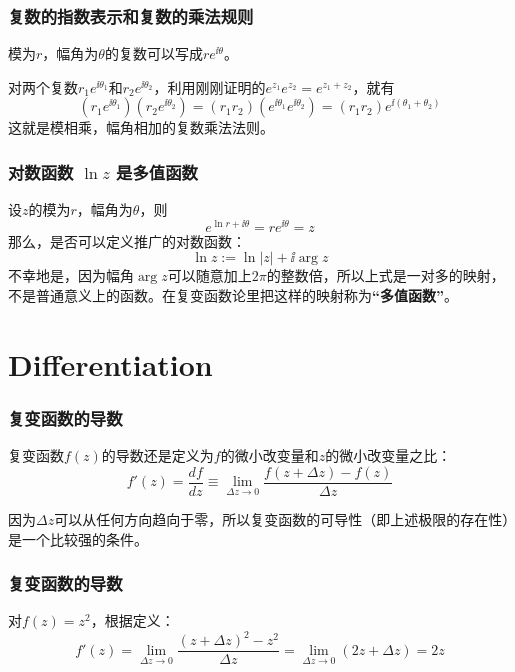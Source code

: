 \documentclass[CJK]{beamer}
\begin{document}
\begin{frame}
  \frametitle{复数的指数表示和复数的乘法规则}
  
      {\blue 模为$r$，幅角为$\theta$的复数可以写成$re^{\ii\theta}$。}
      
  对两个复数$r_1e^{\ii \theta_1}$和$r_2e^{\ii\theta_2}$，利用刚刚证明的$e^{z_1}e^{z_2} =e^{z_1+z_2}$，就有
  $$\left(r_1e^{\ii \theta_1}\right)\left(r_2e^{\ii\theta_2}\right) = (r_1r_2)\left(e^{\ii\theta_1}e^{\ii\theta_2}\right)= (r_1r_2)e^{\ii(\theta_1+\theta_2)}$$
      这就是模相乘，幅角相加的复数乘法法则。  
  
  
\end{frame}

\begin{frame}
  \frametitle{对数函数 $\ln z$ 是多值函数}
  
  设$z$的模为$r$，幅角为$\theta$，则 
  $$e^{\ln r + \ii \theta} = r e^{\ii\theta} = z$$
  那么，是否可以定义推广的对数函数：
  $$\ln z := \ln |z| + \ii \arg z$$
  不幸地是，因为幅角$\arg z$可以随意加上$2\pi$的整数倍，所以上式是一对多的映射，不是普通意义上的函数。在复变函数论里把这样的映射称为{\bf ``多值函数''}。
  
\end{frame}

\section{Differentiation}


\begin{frame}
  \frametitle{复变函数的导数}
  
  复变函数$f(z)$的导数还是定义为$f$的微小改变量和$z$的微小改变量之比：
  $$f'(z) = \frac{df}{dz} \equiv \lim_{\Delta z\rightarrow 0}\frac{f(z+\Delta z)-f(z)}{\Delta z}$$

  因为$\Delta z$可以从任何方向趋向于零，所以复变函数的可导性（即上述极限的存在性）是一个比较强的条件。
  
\end{frame}

\begin{frame}
  \frametitle{复变函数的导数}
  
  对$f(z)=z^2$，根据定义：
  $$f'(z) = \lim_{\Delta z\rightarrow 0}\frac{(z+\Delta z)^2-z^2}{\Delta z} = \lim_{\Delta z\rightarrow 0}(2z +\Delta z) = 2z $$
  
\end{frame}
\end{document}
